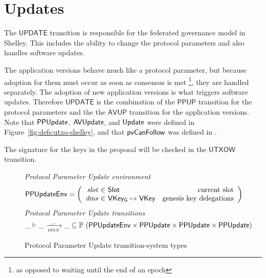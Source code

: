 \section{Updates}
\label{sec:update}


The $\mathsf{UPDATE}$ transition is responsible for the federated governance model in Shelley.
This includes the ability to change the protocol parameters and also handles software
updates.

The application versions behave much like a protocol parameter, but because adoption
for them must occur as soon as consensus is met
\footnote{as opposed to waiting until the end of an epoch},
they are handled separately.
The adoption of new application versions is what triggers software updates.
Therefore $\mathsf{UPDATE}$ is the combination of the
$\mathsf{PPUP}$ transition for the protocol parameters and the
the $\mathsf{AVUP}$ transition for the application versions.
Note that $\mathsf{PPUpdate}$, $\mathsf{AVUpdate}$, and $\mathsf{Update}$ were defined in
Figure~\ref{fig:defs:utxo-shelley}, and that $\mathsf{pvCanFollow}$
was defined in \cite{byron_ledger_spec}.


The signature for the keys in the proposal will be checked in the
$\mathsf{UTXOW}$ transition.


\begin{figure}[htb]
  \emph{Protocol Parameter Update environment}
  \begin{equation*}
    \PPUpdateEnv =
    \left(
      \begin{array}{r@{~\in~}lr}
        \var{slot} & \Slot & \text{current slot}\\
        \var{dms} & \VKeyGen\mapsto\VKey & \text{genesis key delegations} \\
      \end{array}
    \right)
  \end{equation*}
  \emph{Protocol Parameter Update transitions}
  \begin{equation*}
    \_ \vdash
    \var{\_} \trans{ppup}{\_} \var{\_}
    \subseteq \powerset (\PPUpdateEnv \times \PPUpdate \times \PPUpdate \times \PPUpdate)
  \end{equation*}
  \caption{Protocol Parameter Update transition-system types}
  \label{fig:ts-types:pp-update}
\end{figure}

